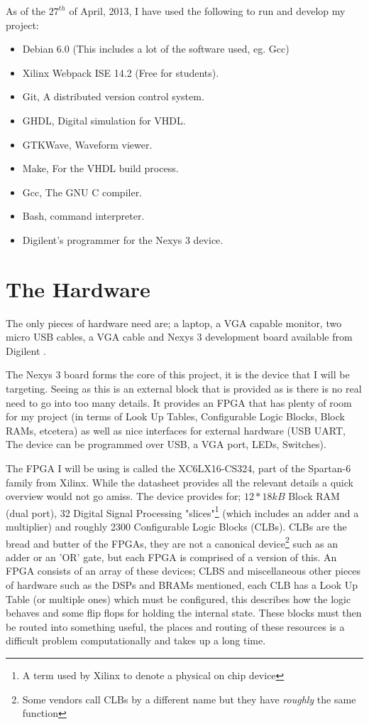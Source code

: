\documentclass	[a4paper, 10pt]	{article}
\begin{document}
    As of the $27^{th}$ of April, 2013, I have used the following to run and develop
    my project:

    \begin{itemize}
      \item Debian 6.0 (This includes a lot of the software used, eg. Gcc)
      \item Xilinx Webpack ISE 14.2 (Free for students).
      \item Git, A distributed version control system.
      \item GHDL, Digital simulation for VHDL.
      \item GTKWave, Waveform viewer.
      \item Make, For the VHDL build process.
      \item Gcc, The GNU C compiler.
      \item Bash, command interpreter.
      \item Digilent's programmer for the Nexys 3 device.
    \end{itemize}


  \section{The Hardware}

  The only pieces of hardware need are; a laptop, a VGA capable monitor, two micro USB cables,
  a VGA cable and Nexys 3 development board available from Digilent \cite{nexysDigilent}.

  The Nexys 3 board forms the core of this project, it is the device that I will be targeting.
  Seeing as this is an external block that is provided as is there is no real need to go into
  too many details. It provides an FPGA that has plenty of room for my project (in terms of
  Look Up Tables, Configurable Logic Blocks, Block RAMs, etcetera) as well as nice interfaces
  for external hardware (USB UART, The device can be programmed over USB, a VGA port, LEDs,
  Switches).

  The FPGA I will be using is called the XC6LX16-CS324, part of the Spartan-6 family from
  Xilinx\cite{xilinxDataSheet}. While the datasheet provides all the relevant details a
  quick overview would not go amiss. The device provides for; $12*18kB$ Block RAM (dual
  port), 32 Digital Signal Processing "slices"\footnote{A term used by Xilinx to denote
  a physical on chip device} (which includes an adder and a multiplier) and roughly
  2300 Configurable Logic Blocks (CLBs). CLBs are the bread and butter of the FPGAs,
  they are not a canonical device\footnote{Some vendors call CLBs by a different name
  but they have \emph{roughly} the same function} such as an adder or an 'OR' gate, but each FPGA is
  comprised of a version of this. An FPGA consists of an array of these devices; CLBS and
  miscellaneous other pieces of hardware such as the DSPs and BRAMs mentioned, each
  CLB has a Look Up Table (or multiple ones) which must be configured, this describes
  how the logic behaves and some flip flops for holding the internal state. These
  blocks must then be routed into something useful, the places and routing of these
  resources is a difficult problem computationally and takes up a long time.
\end{document}

